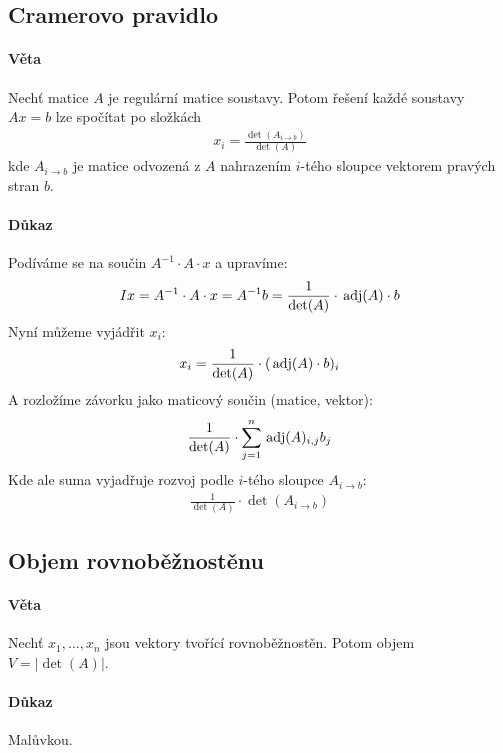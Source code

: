 \documentclass[a4paper,10pt]{article}
\begin{document}
\subsection{Cramerovo pravidlo}
\setcounter{equation}{0}
\paragraph{Věta}
Nechť matice $A$ je regulární matice soustavy. Potom řešení každé soustavy $Ax =
b$ lze spočítat po složkách 
\begin{align*}
	x_i = \frac{\det(A_{i\to b})}{\det(A)}
\end{align*}
kde $A_{i\to b}$ je matice odvozená z $A$ nahrazením $i$-tého sloupce vektorem
pravých stran $b$.
\paragraph{Důkaz}
Podíváme se na součin $A^{-1} \cdot A \cdot x$ a upravíme:
\begin{align}
	I x = A^{-1} \cdot A \cdot x = A^{-1} b = \frac{1}{\det(A)} \cdot \operatorname*{\,adj}(A) \cdot b \\
\end{align}
Nyní můžeme vyjádřit $x_i$:
\begin{align}
	x_i = \frac{1}{\det(A)} \cdot (\operatorname*{\,adj}(A) \cdot b)_i 
\end{align}
A rozložíme závorku jako maticový součin (matice, vektor):
\begin{align}
	\frac{1}{\det(A)} \cdot \sum_{j=1}^n \operatorname*{\,adj}(A)_{i,j} b_j
\end{align}
Kde ale suma vyjadřuje rozvoj podle $i$-tého sloupce $A_{i\to b}$:
\begin{align}
	\frac{1}{\det(A)} \cdot \det(A_{i \to b})
\end{align}

\subsection{Objem rovnoběžnostěnu}
\setcounter{equation}{0}
\paragraph{Věta}
Nechť $x_1, ..., x_n$ jsou vektory tvořící rovnoběžnostěn. Potom objem
$V=|\det(A)|$.
\paragraph{Důkaz}
Malůvkou.

\newpage
\end{document}
